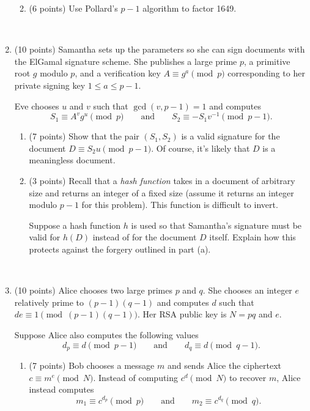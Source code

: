 \documentclass[11pt]{article}
\theoremstyle{plain}
\begin{document}
\begin{enumerate}
\begin{enumerate}
        \vfill
        \item (6 points) Use Pollard's $p-1$ algorithm to factor 1649.

        \vfill
    \end{enumerate}


    \newpage
    \ 
    \newpage

    \item (10 points)
    Samantha sets up the parameters so she can sign documents with the ElGamal signature scheme.
    She publishes a large prime $p$, a primitive root $g$ modulo $p$, and a verification key $A\equiv g^a\pmod p$ corresponding to her private signing key $1\leq a\leq p-1$.

    Eve chooses $u$ and $v$ such that $\gcd(v, p-1) = 1$ and computes
    \[
        S_1 \equiv A^vg^u\pmod p\qquad\text{and}\qquad S_2\equiv -S_1v^{-1}\pmod{p-1}.
    \]
    \begin{enumerate}
        \item (7 points)
        Show that the pair $(S_1, S_2)$ is a valid signature for the document $D \equiv S_2u\pmod{p-1}$.
        Of course, it's likely that $D$ is a meaningless document.

        \vfill

        \item (3 points)
        Recall that a \emph{hash function} takes in a document of arbitrary size and returns an integer of a fixed size (assume it returns an integer modulo $p-1$ for this problem).
        This function is difficult to invert.

        Suppose a hash function $h$ is used so that Samantha's signature must be valid for $h(D)$ instead of for the document $D$ itself.
        Explain how this protects against the forgery outlined in part (a).

        \vfill
    \end{enumerate}

    \newpage
    \ 
    \newpage

    \item (10 points)
    Alice chooses two large primes $p$ and $q$.
    She chooses an integer $e$ relatively prime to $(p-1)(q-1)$ and computes $d$ such that $de\equiv 1\pmod{(p-1)(q-1)}$.
    Her RSA public key is $N = pq$ and $e$.

    Suppose Alice also computes the following values
    \[
        d_p \equiv d\pmod{p-1}\qquad\text{and}\qquad d_q \equiv d\pmod{q-1}.
    \]

    \begin{enumerate}
        \item (7 points) Bob chooses a message $m$ and sends Alice the ciphertext $c \equiv m^e\pmod N$.
        Instead of computing $c^d\pmod N$ to recover $m$, Alice instead computes
        \[
            m_1 \equiv c^{d_p}\pmod p\qquad\text{and}\qquad m_2\equiv c^{d_q}\pmod q.
        \]


\end{enumerate}
\end{enumerate}
\end{document}
